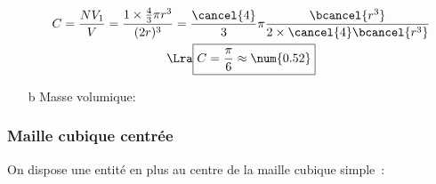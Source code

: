 \documentclass[../../main/main.tex]{subfiles}
\begin{document}
\begin{tcb*}[breakable]
\begin{itemize}
{\begin{gather*}
				C =
				\frac{NV_1}{V} =
				\frac{1 \times \frac{4}{3}\pi r^3}{(2r)^3} =
				\frac{\cancel{4}}{3}\pi \frac{\bcancel{r^3}}{2 \times \cancel{4}
					\bcancel{r^3}}
				\\\Lra
				\boxed{C = \frac{\pi}{6} \approx \num{0.52}}
			\end{gather*}
		}%
		\item[b]{Masse volumique}:
		\leavevmode\vspace*{-25pt}\relax
	\end{itemize}
\end{tcb*}

\subsubsection{Maille cubique centrée}
On dispose une entité en plus au centre de la maille cubique simple~:
\end{document}
